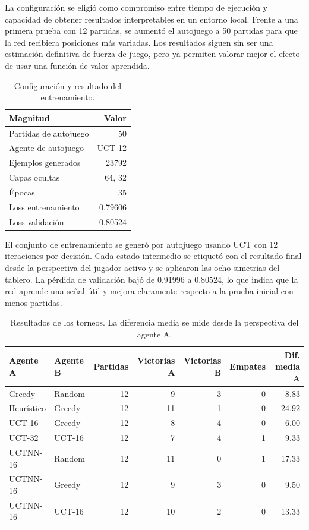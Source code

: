 \documentclass[conference,a4paper]{IEEEtran}
\begin{document}
La configuración se eligió como compromiso entre tiempo de ejecución y
capacidad de obtener resultados interpretables en un entorno local. Frente a una
primera prueba con 12 partidas, se aumentó el autojuego a 50 partidas para que
la red recibiera posiciones más variadas. Los resultados siguen sin ser una
estimación definitiva de fuerza de juego, pero ya permiten valorar mejor el
efecto de usar una función de valor aprendida.

\begin{table}[h]
\centering
\caption{Configuración y resultado del entrenamiento.}
\label{tab:entrenamiento}
\begin{tabular}{lr}
\toprule
Magnitud & Valor \\
\midrule
Partidas de autojuego & 50 \\
Agente de autojuego & UCT-12 \\
Ejemplos generados & 23792 \\
Capas ocultas & 64, 32 \\
Épocas & 35 \\
Loss entrenamiento & 0.79606 \\
Loss validación & 0.80524 \\
\bottomrule
\end{tabular}
\end{table}

El conjunto de entrenamiento se generó por autojuego usando UCT con 12
iteraciones por decisión. Cada estado intermedio se etiquetó con el resultado
final desde la perspectiva del jugador activo y se aplicaron las ocho simetrías
del tablero. La pérdida de validación bajó de 0.91996 a 0.80524, lo que indica
que la red aprende una señal útil y mejora claramente respecto a la prueba
inicial con menos partidas.

\begin{table}[t]
\centering
\caption{Resultados de los torneos. La diferencia media se mide desde la perspectiva del agente A.}
\label{tab:torneos}
\begin{tabular}{llrrrrr}
\toprule
Agente A & Agente B & Partidas & Victorias A & Victorias B & Empates & Dif. media A \\
\midrule
Greedy & Random & 12 & 9 & 3 & 0 & 8.83 \\
Heurístico & Greedy & 12 & 11 & 1 & 0 & 24.92 \\
UCT-16 & Greedy & 12 & 8 & 4 & 0 & 6.00 \\
UCT-32 & UCT-16 & 12 & 7 & 4 & 1 & 9.33 \\
UCTNN-16 & Random & 12 & 11 & 0 & 1 & 17.33 \\
UCTNN-16 & Greedy & 12 & 9 & 3 & 0 & 9.50 \\
UCTNN-16 & UCT-16 & 12 & 10 & 2 & 0 & 13.33 \\
\bottomrule
\end{tabular}
\end{table}
\end{document}
